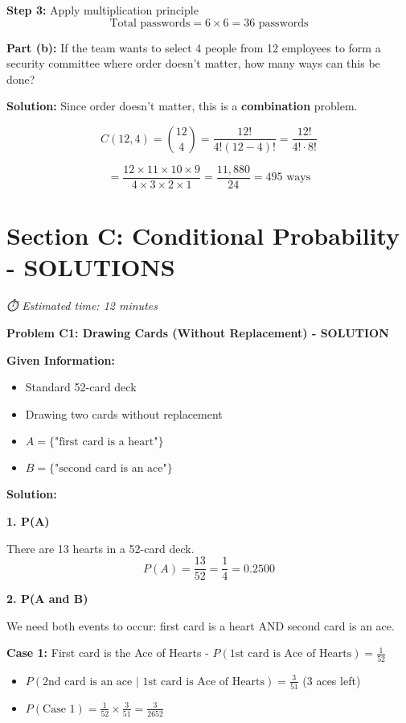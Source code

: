 \documentclass[
  11pt,
]{article}
\begin{document}
\textbf{Step 3:} Apply multiplication principle
\[\text{Total passwords} = 6 \times 6 = \boxed{36 \text{ passwords}}\]

\textbf{Part (b):} If the team wants to select 4 people from 12
employees to form a security committee where order doesn't matter, how
many ways can this be done?

\textbf{Solution:} Since order doesn't matter, this is a
\textbf{combination} problem.

\[C(12,4) = \binom{12}{4} = \frac{12!}{4!(12-4)!} = \frac{12!}{4! \cdot 8!}\]

\[= \frac{12 \times 11 \times 10 \times 9}{4 \times 3 \times 2 \times 1} = \frac{11,880}{24} = \boxed{495 \text{ ways}}\]

\section{Section C: Conditional Probability -
SOLUTIONS}\label{section-c-conditional-probability---solutions}

\emph{⏱️ Estimated time: 12 minutes}

\textbf{Problem C1: Drawing Cards (Without Replacement) - SOLUTION}

\textbf{Given Information:}

\begin{itemize}
\item
  Standard 52-card deck
\item
  Drawing two cards without replacement
\item
  \(A = \{\text{"first card is a heart"}\}\)
\item
  \(B = \{\text{"second card is an ace"}\}\)
\end{itemize}

\textbf{Solution:}

\textbf{1. P(A)}

There are 13 hearts in a 52-card deck.
\[P(A) = \frac{13}{52} = \boxed{\frac{1}{4} = 0.2500}\]

\textbf{2. P(A and B)}

We need both events to occur: first card is a heart AND second card is
an ace.

\textbf{Case 1:} First card is the Ace of Hearts -
\(P(\text{1st card is Ace of Hearts}) = \frac{1}{52}\)

\begin{itemize}
\item
  \(P(\text{2nd card is an ace | 1st card is Ace of Hearts}) = \frac{3}{51}\)
  (3 aces left)
\item
  \(P(\text{Case 1}) = \frac{1}{52} \times \frac{3}{51} = \frac{3}{2652}\)
\end{itemize}
\end{document}
